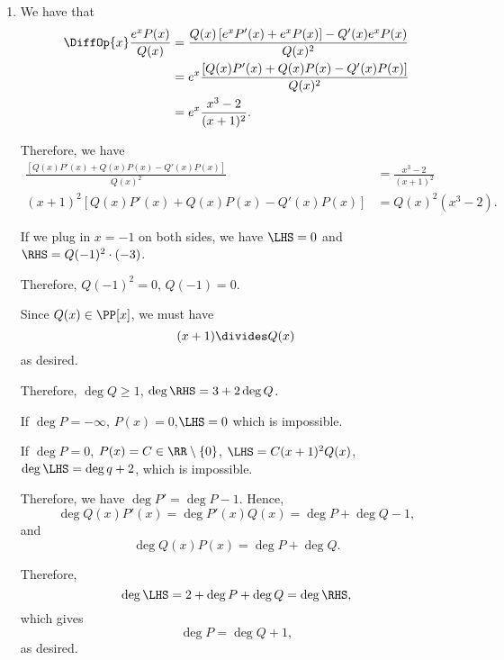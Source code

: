 \Question{\currfilebase}

\begin{enumerate}
    \item We have that
          \begin{align*}
              \DiffOp{x} \frac{e^x P(x)}{Q(x)} & = \frac{Q(x) \left[e^x P'(x) + e^x P(x)\right] - Q'(x) e^x P(x)}{Q(x)^2} \\
                                               & = e^x \frac{\left[Q(x)P'(x) + Q(x)P(x) - Q'(x)P(x)\right]}{Q(x)^2}       \\
                                               & = e^x \frac{x^3 - 2}{(x + 1)^2}.
          \end{align*}

          Therefore, we have
          \begin{align*}
              \frac{\left[Q(x)P'(x) + Q(x)P(x) - Q'(x)P(x)\right]}{Q(x)^2} & = \frac{x^3 - 2}{(x + 1)^2}    \\
              (x+1)^2 \left[Q(x)P'(x) + Q(x)P(x) - Q'(x)P(x)\right]        & = Q(x)^2 \left(x^3 - 2\right).
          \end{align*}

          If we plug in \(x = -1\) on both sides, we have \(\LHS = 0\) and \(\RHS = Q(-1)^2 \cdot (-3)\).

          Therefore, \(Q(-1)^2 = 0\), \(Q(-1) = 0\).

          Since \(Q(x) \in \PP[x]\), we must have
          \[
              (x + 1) \divides Q(x)
          \]
          as desired.

          Therefore, \(\deg Q \geq 1\), \(\deg \RHS = 3 + 2 \deg Q\).

          If \(\deg P = -\infty\), \(P(x) = 0\),\(\LHS = 0\) which is impossible.

          If \(\deg P = 0\), \(P(x) = C \in \RR \setminus \{0\}\), \(\LHS = C(x + 1)^2 Q(x)\), \(\deg \LHS = \deg q + 2\), which is impossible.

          Therefore, we have \(\deg P' = \deg P - 1\).
          Hence,
          \[
              \deg Q(x) P'(x) = \deg P'(x) Q(x) = \deg P + \deg Q - 1,
          \]
          and
          \[
              \deg Q(x) P(x) = \deg P + \deg Q.
          \]

          Therefore,
          \[
              \deg \LHS = 2 + \deg P + \deg Q = \deg \RHS,
          \]
          which gives
          \[
              \deg P = \deg Q + 1,
          \]
          as desired.


\end{enumerate}
